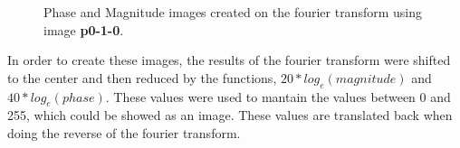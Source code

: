 \documentclass[12pt,a4paper]{article}
\begin{document}
\begin{figure}[!h]
	\centering
	\quad
	\caption{Phase and Magnitude images created on the fourier transform using image \textbf{p0-1-0}.}
	\label{fig:mag-phase}
\end{figure}

In order to create these images, the results of the fourier transform were shifted to the center and then reduced by the functions, $20*log_e(magnitude)$ and $40*log_e(phase)$. These values were used to mantain the values between 0 and 255, which could be showed as an image. These values are translated back when doing the reverse of the fourier transform. \\
\end{document}
